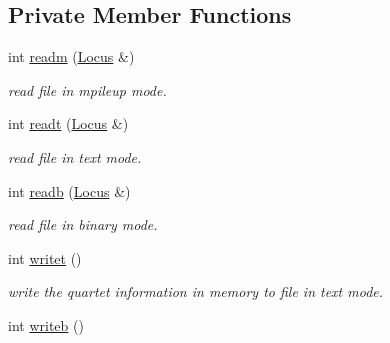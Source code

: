 \subsection*{Private Member Functions}
\begin{DoxyCompactItemize}
\item 
\hypertarget{classprofile_aebf3fba39b3e7ac6f210a0883dd8b677}{int \hyperlink{classprofile_aebf3fba39b3e7ac6f210a0883dd8b677}{readm} (\hyperlink{classLocus}{Locus} \&)}\label{classprofile_aebf3fba39b3e7ac6f210a0883dd8b677}

\begin{DoxyCompactList}\small\item\em read file in mpileup mode. \end{DoxyCompactList}\item 
\hypertarget{classprofile_a50997b8c7faae6108e126b0762732d1a}{int \hyperlink{classprofile_a50997b8c7faae6108e126b0762732d1a}{readt} (\hyperlink{classLocus}{Locus} \&)}\label{classprofile_a50997b8c7faae6108e126b0762732d1a}

\begin{DoxyCompactList}\small\item\em read file in text mode. \end{DoxyCompactList}\item 
\hypertarget{classprofile_a19b626b1ec987df65265d3929a1f807a}{int \hyperlink{classprofile_a19b626b1ec987df65265d3929a1f807a}{readb} (\hyperlink{classLocus}{Locus} \&)}\label{classprofile_a19b626b1ec987df65265d3929a1f807a}

\begin{DoxyCompactList}\small\item\em read file in binary mode. \end{DoxyCompactList}\item 
\hypertarget{classprofile_a11d3b214db91cbbb84d408c13840018a}{int \hyperlink{classprofile_a11d3b214db91cbbb84d408c13840018a}{writet} ()}\label{classprofile_a11d3b214db91cbbb84d408c13840018a}

\begin{DoxyCompactList}\small\item\em write the quartet information in memory to file in text mode. \end{DoxyCompactList}\item 
\hypertarget{classprofile_a9d98bbf6f9bcd8f2547674067aa3a8da}{int \hyperlink{classprofile_a9d98bbf6f9bcd8f2547674067aa3a8da}{writeb} ()}\label{classprofile_a9d98bbf6f9bcd8f2547674067aa3a8da}


\end{DoxyCompactItemize}
